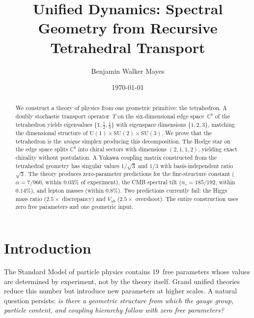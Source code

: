 \documentclass[%
 aip,
 amsmath,amssymb,
 reprint,%
]{revtex4-1}
\newcommand{\half}{\tfrac{1}{2}}
\newcommand{\third}{\tfrac{1}{3}}
\newcommand{\CC}{\mathbb{C}}
\begin{document}

\title{Unified Dynamics: Spectral Geometry from Recursive Tetrahedral Transport}

\author{Benjamin Walker Mayes}

\date{\today}

\begin{abstract}
We construct a theory of physics from one geometric primitive: the tetrahedron. A doubly stochastic transport operator~$T$ on the six-dimensional edge space~$\CC^6$ of the tetrahedron yields eigenvalues $\{1,\half,\third\}$ with eigenspace dimensions $\{1,2,3\}$, matching the dimensional structure of $\mathrm{U}(1)\times\mathrm{SU}(2)\times\mathrm{SU}(3)$. We prove that the tetrahedron is the \emph{unique} simplex producing this decomposition. The Hodge star on the edge space splits $\CC^6$ into chiral sectors with dimensions $(2,1,1,2)$, yielding exact chirality without postulation. A Yukawa coupling matrix constructed from the tetrahedral geometry has singular values $1/\sqrt{3}$ and $1/3$ with basis-independent ratio~$\sqrt{3}$. The theory produces zero-parameter predictions for the fine-structure constant ($\alpha=7/960$, within $0.03\%$ of experiment), the CMB spectral tilt ($n_s=185/192$, within $0.14\%$), and lepton masses (within $0.8\%$). Two predictions currently fail: the Higgs mass ratio ($2.5\times$ discrepancy) and $V_{ub}$ ($2.5\times$ overshoot). The entire construction uses zero free parameters and one geometric input.
\end{abstract}

\maketitle

\section{\label{sec:intro}Introduction}

The Standard Model of particle physics contains 19~free parameters whose values are determined by experiment, not by the theory itself.\cite{PDG2024} Grand unified theories reduce this number but introduce new parameters at higher scales. A natural question persists: \emph{is there a geometric structure from which the gauge group, particle content, and coupling hierarchy follow with zero free parameters?}
\end{document}
